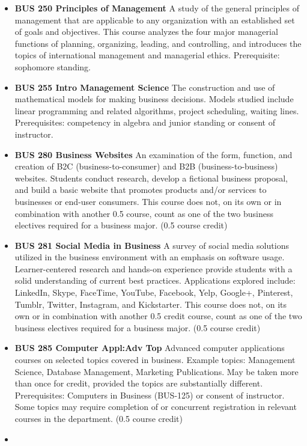 \documentclass[
  letterpaper,
]{scrbook}
\begin{document}
\begin{itemize}
\item
  \textbf{BUS 250 Principles of Management} A study of the general
  principles of management that are applicable to any organization with
  an established set of goals and objectives. This course analyzes the
  four major managerial functions of planning, organizing, leading, and
  controlling, and introduces the topics of international management and
  managerial ethics. Prerequisite: sophomore standing.
\item
  \textbf{BUS 255 Intro Management Science} The construction and use of
  mathematical models for making business decisions. Models studied
  include linear programming and related algorithms, project scheduling,
  waiting lines. Prerequisites: competency in algebra and junior
  standing or consent of instructor.
\item
  \textbf{BUS 280 Business Websites} An examination of the form,
  function, and creation of B2C (business-to-consumer) and B2B
  (business-to-business) websites. Students conduct research, develop a
  fictional business proposal, and build a basic website that promotes
  products and/or services to businesses or end-user consumers. This
  course does not, on its own or in combination with another 0.5 course,
  count as one of the two business electives required for a business
  major. (0.5 course credit)
\item
  \textbf{BUS 281 Social Media in Business} A survey of social media
  solutions utilized in the business environment with an emphasis on
  software usage. Learner-centered research and hands-on experience
  provide students with a solid understanding of current best practices.
  Applications explored include: LinkedIn, Skype, FaceTime, YouTube,
  Facebook, Yelp, Google+, Pinterest, Tumblr, Twitter, Instagram, and
  Kickstarter. This course does not, on its own or in combination with
  another 0.5 credit course, count as one of the two business electives
  required for a business major. (0.5 course credit)
\item
  \textbf{BUS 285 Computer Appl:Adv Top} Advanced computer applications
  courses on selected topics covered in business. Example topics:
  Management Science, Database Management, Marketing Publications. May
  be taken more than once for credit, provided the topics are
  substantially different. Prerequisites: Computers in Business
  (BUS-125) or consent of instructor. Some topics may require completion
  of or concurrent registration in relevant courses in the department.
  (0.5 course credit)
\item

\end{itemize}
\end{document}
